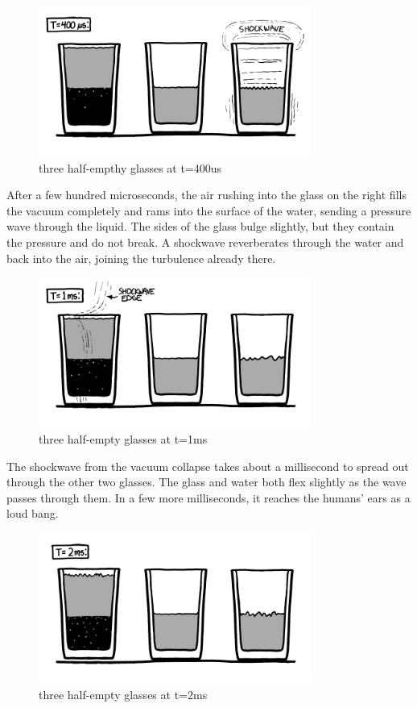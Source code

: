 \begin{figure}[!htbp]
\centering
\includegraphics[scale=0.5, max width=0.8\textwidth]{imgs/a/6/glass_400ns.png}
\caption{three half-empthy glasses at t=400us}
\end{figure}

{After a few hundred microseconds, the air rushing into the glass on the right fills the vacuum completely and rams into the surface of the water, sending a pressure wave through the liquid. The sides of the glass bulge slightly, but they contain the pressure and do not break. A shockwave reverberates through the water and back into the air, joining the turbulence already there.}

\begin{figure}[!htbp]
\centering
\includegraphics[scale=0.5, max width=0.8\textwidth]{imgs/a/6/glass_1ms.png}
\caption{three half-empty glasses at t=1ms}
\end{figure}

{The shockwave from the vacuum collapse takes about a millisecond to spread out through the other two glasses. The glass and water both flex slightly as the wave passes through them. In a few more milliseconds, it reaches the humans’ ears as a loud bang.}

\begin{figure}[!htbp]
\centering
\includegraphics[scale=0.5, max width=0.8\textwidth]{imgs/a/6/glass_2ms.png}
\caption{three half-empty glasses at t=2ms}
\end{figure}

